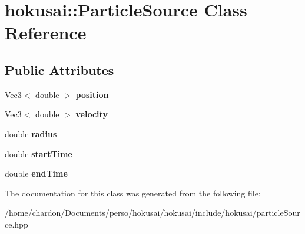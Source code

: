 \hypertarget{classhokusai_1_1ParticleSource}{\section{hokusai\+:\+:Particle\+Source Class Reference}
\label{classhokusai_1_1ParticleSource}
}
\subsection*{Public Attributes}
\begin{DoxyCompactItemize}
\item 
\hypertarget{classhokusai_1_1ParticleSource_a7dd2a8a224830d7a5df4e41b660eb1ec}{\hyperlink{classhokusai_1_1Vec3}{Vec3}$<$ double $>$ {\bfseries position}}\label{classhokusai_1_1ParticleSource_a7dd2a8a224830d7a5df4e41b660eb1ec}

\item 
\hypertarget{classhokusai_1_1ParticleSource_aa91593c7dfe0428973db3ef37cbe508c}{\hyperlink{classhokusai_1_1Vec3}{Vec3}$<$ double $>$ {\bfseries velocity}}\label{classhokusai_1_1ParticleSource_aa91593c7dfe0428973db3ef37cbe508c}

\item 
\hypertarget{classhokusai_1_1ParticleSource_a8041c27dd2bd21de9def21df2af67670}{double {\bfseries radius}}\label{classhokusai_1_1ParticleSource_a8041c27dd2bd21de9def21df2af67670}

\item 
\hypertarget{classhokusai_1_1ParticleSource_a519a78131f7870d0d59e26f508f00505}{double {\bfseries start\+Time}}\label{classhokusai_1_1ParticleSource_a519a78131f7870d0d59e26f508f00505}

\item 
\hypertarget{classhokusai_1_1ParticleSource_a4b1e4c0f9d52dc037d82b999e65f0b3c}{double {\bfseries end\+Time}}\label{classhokusai_1_1ParticleSource_a4b1e4c0f9d52dc037d82b999e65f0b3c}

\end{DoxyCompactItemize}


The documentation for this class was generated from the following file\+:\begin{DoxyCompactItemize}
\item 
/home/chardon/\+Documents/perso/hokusai/hokusai/include/hokusai/particle\+Source.\+hpp\end{DoxyCompactItemize}
